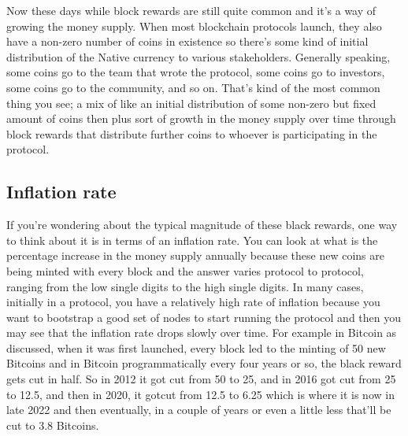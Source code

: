 Now these days while block rewards are still quite common and it's a way of growing the money supply. When most blockchain protocols launch, they also have a non-zero number of coins in existence so there's some kind of initial distribution of the Native currency to various stakeholders. Generally speaking, some coins go to the team that wrote the protocol, some coins go to investors, some coins go to the community, and so on. That's kind of the most common thing you see; a mix of like an initial distribution of some non-zero but fixed amount of coins then plus sort of growth in the money supply over time through block rewards that distribute further coins to whoever is participating in the protocol.\\

\subsection{Inflation rate}

If you're wondering about the typical magnitude of these black rewards, one way to think about it is in terms of an inflation rate.
 You can look at what is the percentage increase in the money supply annually because these new coins are being minted with every block
and the answer varies protocol to protocol, ranging from the low single digits to the high single digits. In many cases, initially in 
a protocol, you have a relatively high rate of inflation because you want to bootstrap a good set of nodes to start running the protocol
and then you may see that the inflation rate drops slowly over time. For example in Bitcoin as discussed, when it was first launched, 
every block led to the minting of 50 new Bitcoins and in Bitcoin programmatically every four years or so, the black reward gets cut in half. 
So in 2012 it got cut from 50 to 25, and in 2016 got cut from 25 to 12.5, and then in 2020, it gotcut from 12.5 to 6.25 which is where 
it is now in late 2022 and then eventually, in a couple of years or even a little less that'll be cut to 3.8 Bitcoins.\\


